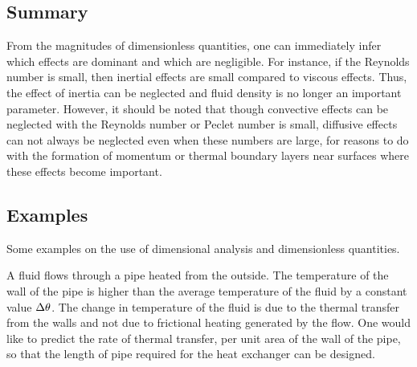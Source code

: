 \subsection{Summary}
From the magnitudes of dimensionless quantities, one can immediately infer which effects are dominant and which are negligible. For instance, if the Reynolds number is small, then inertial effects are small compared to viscous effects. Thus, the effect of inertia can be neglected and fluid density is no longer an important parameter. However, it should be noted that though convective effects can be neglected with the Reynolds number or Peclet number is small, diffusive effects can not always be neglected even when these numbers are large, for reasons to do with the formation of momentum or thermal boundary layers near surfaces where these effects become important.


\subsection{Examples}
Some examples on the use of dimensional analysis and dimensionless quantities.

\begin{example}
A fluid flows through a pipe heated from the outside. The temperature of the wall of the pipe is higher than the average temperature of the fluid by a constant value $\Delta\theta$. The change in temperature of the fluid is due to the thermal transfer from the walls and not due to frictional heating generated by the flow. One would like to predict the rate of thermal transfer, per unit area of the wall of the pipe, so that the length of pipe required for the heat exchanger can be designed.
\end{example}

